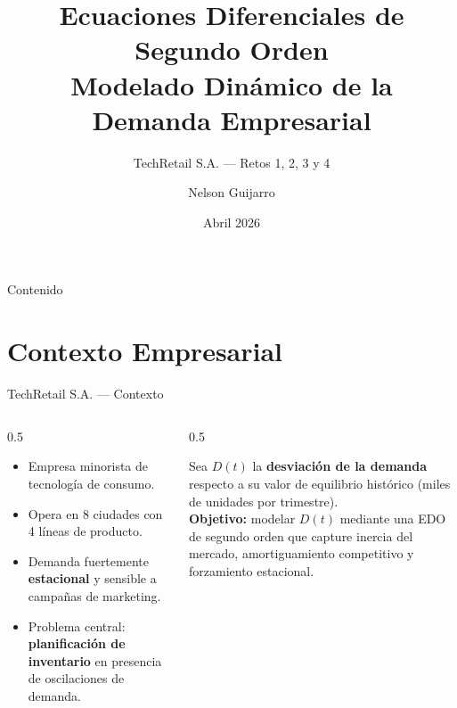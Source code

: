 \documentclass[10pt,aspectratio=169]{beamer}
\title[EDO de 2.º Orden en la Empresa]{%
  \textbf{Ecuaciones Diferenciales de Segundo Orden}\\[4pt]
  \large Modelado Dinámico de la Demanda Empresarial}
\subtitle{TechRetail S.A. — Retos 1, 2, 3 y 4}
\author {Nelson Guijarro}
\date{Abril 2026}
\begin{document}

\begin{frame}[plain]
  \titlepage
\end{frame}

\begin{frame}{Contenido}
  \tableofcontents
\end{frame}

\section{Contexto Empresarial}

\begin{frame}{TechRetail S.A. — Contexto}
  \begin{columns}[T]
    \begin{column}{0.5\textwidth}
      \begin{tcolorbox}[modelbox={Perfil de la empresa}]
        \small
        \begin{itemize}
          \item Empresa minorista de tecnología de consumo.
          \item Opera en 8 ciudades con 4 líneas de producto.
          \item Demanda fuertemente \textbf{estacional} y sensible a
                campañas de marketing.
          \item Problema central: \textbf{planificación de inventario}
                en presencia de oscilaciones de demanda.
        \end{itemize}
      \end{tcolorbox}
    \end{column}
    \begin{column}{0.5\textwidth}
      \begin{tcolorbox}[resultbox={Variable crítica}]
        \small
        Sea $D(t)$ la \textbf{desviación de la demanda} respecto a su
        valor de equilibrio histórico (miles de unidades por trimestre).\\[6pt]
        \textbf{Objetivo:} modelar $D(t)$ mediante una EDO de
        segundo orden que capture inercia del mercado, amortiguamiento
        competitivo y forzamiento estacional.
      \end{tcolorbox}
    \end{column}
  \end{columns}
\end{frame}
\end{document}
